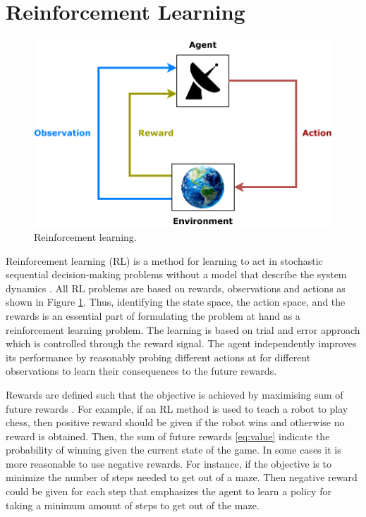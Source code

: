 \documentclass[english, 12pt, a4paper, elec, utf8, a-1b, online]{aaltothesis}
\begin{document}
\newpage
\section{Reinforcement Learning} \label{sec:RL}

\begin{figure}[b]
    \centering
    \includegraphics{figures/RL_diagram.pdf}
    \caption{Reinforcement learning.}
    \label{fig:RL_basics}
\end{figure}

Reinforcement learning (RL) is a method for learning to act in stochastic sequential decision-making problems without a model that describe the system dynamics \cite{Sutton2018}.
All RL problems are based on rewards, observations and actions as shown in Figure \ref{fig:RL_basics}.
Thus, identifying the state space, the action space, and the rewards is an essential part of formulating the problem at hand as a reinforcement learning problem.
The learning is based on trial and error approach which is controlled through the reward signal.
The agent independently improves its performance by reasonably probing different actions at for different observations to learn their consequences to the future rewards.

Rewards are defined such that the objective is achieved by maximising sum of future rewards \cite{Sutton2018}.
For example, if an RL method is used to teach a robot to play chess, then positive reward should be given if the robot wins and otherwise no reward is obtained.
Then, the sum of future rewards \eqref{eq:value} indicate the probability of winning given the current state of the game.
In some cases it is more reasonable to use negative rewards.
For instance, if the objective is to minimize the number of steps needed to get out of a maze. 
Then negative reward could be given for each step that emphasizes the agent to learn a policy for taking a minimum amount of steps to get out of the maze.
\end{document}
